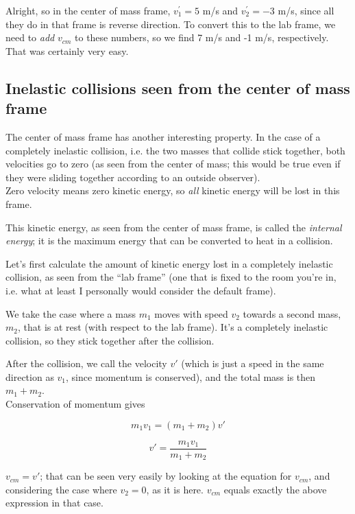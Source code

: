 Alright, so in the center of mass frame, $v_1^{'} = 5$ m/s and $v_2^{'} = -3$ m/s, since all they do in that frame is reverse direction. To convert this to the lab frame, we need to \emph{add} $v_{cm}$ to these numbers, so we find 7 m/s and -1 m/s, respectively. That was certainly very easy.

\subsection{Inelastic collisions seen from the center of mass frame}

The center of mass frame has another interesting property. In the case of a completely inelastic collision, i.e. the two masses that collide stick together, both velocities go to zero (as seen from the center of mass; this would be true even if they were sliding together according to an outside observer).\\
Zero velocity means zero kinetic energy, so \emph{all} kinetic energy will be lost in this frame.

This kinetic energy, as seen from the center of mass frame, is called the \emph{internal energy}; it is the maximum energy that can be converted to heat in a collision.

Let's first calculate the amount of kinetic energy lost in a completely inelastic collision, as seen from the ``lab frame'' (one that is fixed to the room you're in, i.e. what at least I personally would consider the default frame).

We take the case where a mass $m_1$ moves with speed $v_2$ towards a second mass, $m_2$, that is at rest (with respect to the lab frame). It's a completely inelastic collision, so they stick together after the collision.

After the collision, we call the velocity $v'$ (which is just a speed in the same direction as $v_1$, since momentum is conserved), and the total mass is then $m_1 + m_2$.\\
Conservation of momentum gives

\begin{equation}
m_1 v_1 = (m_1 + m_2) v'
\end{equation}

\begin{equation}
v' = \frac{m_1 v_1}{m_1 + m_2}
\end{equation}

$v_{cm} = v'$; that can be seen very easily by looking at the equation for $v_{cm}$, and considering the case where $v_2 = 0$, as it is here. $v_{cm}$ equals exactly the above expression in that case.

